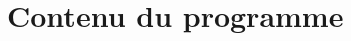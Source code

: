 \documentclass[12pt,oneside]{report}
\begin{document}
\begin{spacing}{1.2}
\section{Contenu du programme}



\section{}



\section{}



\end{spacing}
\end{document}

